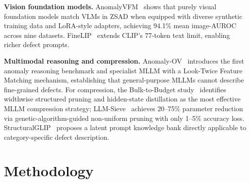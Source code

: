 \documentclass[11pt]{article}
\begin{document}
\textbf{Vision foundation models.}
AnomalyVFM~\cite{fucka2026anomalyvfm} shows that purely visual foundation models
match VLMs in ZSAD when equipped with diverse synthetic training data and LoRA-style
adapters, achieving 94.1\% mean image-AUROC across nine datasets. FineLIP~\cite{asokan2025finelip}
extends CLIP's 77-token text limit, enabling richer defect prompts.

\textbf{Multimodal reasoning and compression.}
Anomaly-OV~\cite{xu2025anomalyov} introduces the first anomaly reasoning benchmark
and specialist MLLM with a Look-Twice Feature Matching mechanism, establishing
that general-purpose MLLMs cannot describe fine-grained defects. For compression,
the Bulk-to-Budget study~\cite{anonymous2025bulktobudget} identifies widthwise
structured pruning and hidden-state distillation as the most effective MLLM
compression strategy; LLM-Sieve~\cite{reda2025llmsieve} achieves 20--75\% parameter
reduction via genetic-algorithm-guided non-uniform pruning with only 1--5\% accuracy
loss. StructuralGLIP~\cite{yang2025structuralglip} proposes a latent prompt knowledge
bank directly applicable to category-specific defect description.

\section{Methodology}


\end{document}

